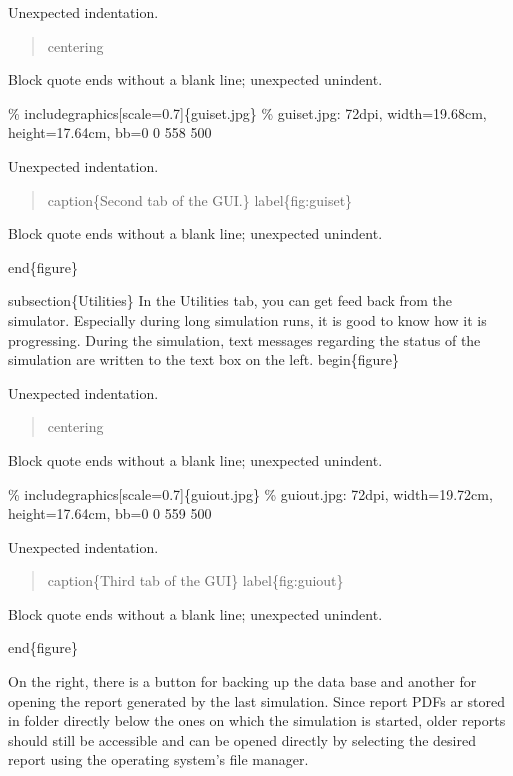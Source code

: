 \documentclass[a4paper,10pt]{manual}
\begin{document}
Unexpected indentation.

\begin{quote}

centering
\end{quote}

Block quote ends without a blank line; unexpected unindent.


\%   includegraphics{[}scale=0.7{]}\{guiset.jpg\}
\% guiset.jpg: 72dpi, width=19.68cm, height=17.64cm, bb=0 0 558 500

Unexpected indentation.

\begin{quote}

caption\{Second tab of the GUI.\}
label\{fig:guiset\}
\end{quote}

Block quote ends without a blank line; unexpected unindent.


end\{figure\}

subsection\{Utilities\}
In the Utilities tab, you can get feed back from the simulator. Especially during long simulation runs, it is good to know how it is progressing. During the simulation, text messages regarding the status of the simulation are written to the text box on the left.
begin\{figure\}

Unexpected indentation.

\begin{quote}

centering
\end{quote}

Block quote ends without a blank line; unexpected unindent.


\%   includegraphics{[}scale=0.7{]}\{guiout.jpg\}
\% guiout.jpg: 72dpi, width=19.72cm, height=17.64cm, bb=0 0 559 500

Unexpected indentation.

\begin{quote}

caption\{Third tab of the GUI\}
label\{fig:guiout\}
\end{quote}

Block quote ends without a blank line; unexpected unindent.


end\{figure\}

On the right, there is a button for backing up the data base and another for opening the report generated by the last simulation. Since report PDFs ar stored in folder directly below the ones on which the simulation is started, older reports should still be accessible and can be opened directly by selecting the desired report using the operating system's file manager.
\end{document}
